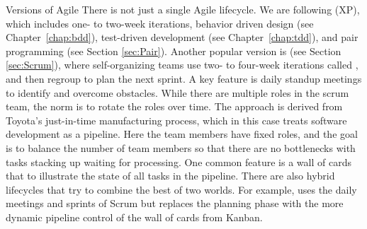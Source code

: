 \begin{elaboration}{Versions of Agile}
There is not just a single Agile lifecycle. We are following  (XP), which includes one- to two-week iterations, behavior driven design (see Chapter~\ref{chap:bdd}), test-driven development (see Chapter~\ref{chap:tdd}), and pair programming (see Section \ref{sec:Pair}). Another popular version is  (see Section \ref{sec:Scrum}), where self-organizing teams use two- to four-week iterations called , and then regroup to plan the next sprint.
A key feature is daily standup meetings to identify and overcome obstacles. While there are multiple roles in the scrum team, the norm is to rotate the roles over time. The  approach is derived from Toyota's just-in-time manufacturing process, which in this case treats software development as a pipeline.
Here the team members have fixed roles, and the goal is to balance the number of team members so that there are no bottlenecks with tasks stacking up waiting for processing. One common feature is a wall of cards that to illustrate the state of all tasks in the pipeline. There are also hybrid lifecycles that try to combine the best of two worlds. For example,  uses the daily meetings and sprints of Scrum but replaces the planning phase with the more dynamic pipeline control of the wall of cards from Kanban.
\end{elaboration}

